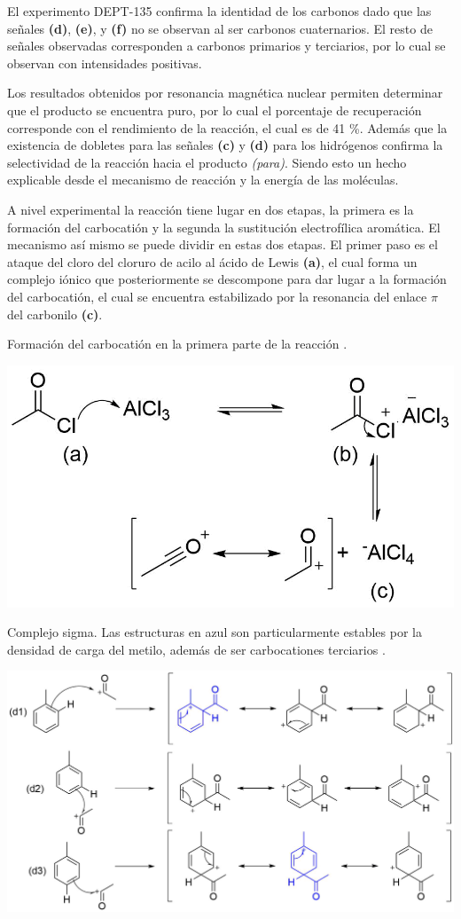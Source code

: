\documentclass[fleqn,11pt]{SelfArx}
\begin{document}
El experimento DEPT-135 confirma la identidad de los carbonos dado que las señales \textbf{(d)}, \textbf{(e)}, y \textbf{(f)} no se observan al ser carbonos cuaternarios. El resto de señales observadas corresponden a carbonos primarios y terciarios, por lo cual se observan con intensidades positivas.

Los resultados obtenidos por resonancia magnética nuclear permiten determinar que el producto se encuentra puro, por lo cual el porcentaje de recuperación corresponde con el rendimiento de la reacción, el cual es de 41 \%. Además que la existencia de dobletes para las señales \textbf{(c)} y \textbf{(d)} para los hidrógenos confirma la selectividad de la reacción hacia el producto \textit{(para)}. Siendo esto un hecho explicable desde el mecanismo de reacción y la energía de las moléculas.

A nivel experimental la reacción tiene lugar en dos etapas, la primera es la formación del carbocatión y la segunda la sustitución electrofílica aromática. El mecanismo así mismo se puede dividir en estas dos etapas. El primer paso es el ataque del cloro del cloruro de acilo al ácido de Lewis \textbf{(a)}, el cual forma un complejo iónico que posteriormente se descompone para dar lugar a la formación del carbocatión, el cual se encuentra estabilizado por la resonancia del enlace $\pi$ del carbonilo \textbf{(c)}.
\begin{scheme}[h]
	\centering
	\caption{Formación del carbocatión en la primera parte de la reacción \cite{Wade2013}.}
	\includegraphics[width=0.9\linewidth]{structures/mechanism1.png}
\end{scheme}

\begin{scheme*}[h]
	\centering
	\caption{Complejo sigma. Las estructuras en azul son particularmente estables por la densidad de carga del metilo, además de ser carbocationes terciarios \cite{Wade2013}.}
	\includegraphics[width=0.7\linewidth]{structures/SigmaComplex.png}
	\label{sch: sigma}
\end{scheme*}
\end{document}
